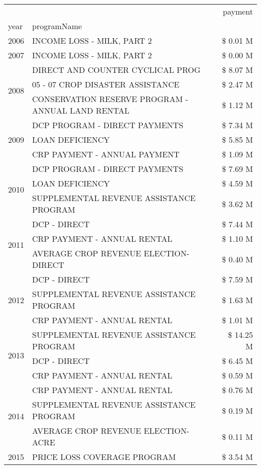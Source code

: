 \begin{tabular}{llr}
\toprule
 &  & payment \\
year & programName &  \\
\midrule
2006 & INCOME LOSS - MILK, PART 2 & \$ 0.01 M \\
\cline{1-3}
2007 & INCOME LOSS - MILK, PART 2 & \$ 0.00 M \\
\cline{1-3}
\multirow[t]{3}{*}{2008} & DIRECT AND COUNTER CYCLICAL PROG & \$ 8.07 M \\
 & 05 - 07 CROP DISASTER ASSISTANCE & \$ 2.47 M \\
 & CONSERVATION RESERVE PROGRAM - ANNUAL LAND RENTAL & \$ 1.12 M \\
\cline{1-3}
\multirow[t]{3}{*}{2009} & DCP PROGRAM - DIRECT PAYMENTS & \$ 7.34 M \\
 & LOAN DEFICIENCY & \$ 5.85 M \\
 & CRP PAYMENT - ANNUAL PAYMENT & \$ 1.09 M \\
\cline{1-3}
\multirow[t]{3}{*}{2010} & DCP PROGRAM - DIRECT PAYMENTS & \$ 7.69 M \\
 & LOAN DEFICIENCY & \$ 4.59 M \\
 & SUPPLEMENTAL REVENUE ASSISTANCE PROGRAM & \$ 3.62 M \\
\cline{1-3}
\multirow[t]{3}{*}{2011} & DCP - DIRECT & \$ 7.44 M \\
 & CRP PAYMENT - ANNUAL RENTAL & \$ 1.10 M \\
 & AVERAGE CROP REVENUE ELECTION-DIRECT & \$ 0.40 M \\
\cline{1-3}
\multirow[t]{3}{*}{2012} & DCP - DIRECT & \$ 7.59 M \\
 & SUPPLEMENTAL REVENUE ASSISTANCE PROGRAM & \$ 1.63 M \\
 & CRP PAYMENT - ANNUAL RENTAL & \$ 1.01 M \\
\cline{1-3}
\multirow[t]{3}{*}{2013} & SUPPLEMENTAL REVENUE ASSISTANCE PROGRAM & \$ 14.25 M \\
 & DCP - DIRECT & \$ 6.45 M \\
 & CRP PAYMENT - ANNUAL RENTAL & \$ 0.59 M \\
\cline{1-3}
\multirow[t]{3}{*}{2014} & CRP PAYMENT - ANNUAL RENTAL & \$ 0.76 M \\
 & SUPPLEMENTAL REVENUE ASSISTANCE PROGRAM & \$ 0.19 M \\
 & AVERAGE CROP REVENUE ELECTION-ACRE & \$ 0.11 M \\
\cline{1-3}
\multirow[t]{3}{*}{2015} & PRICE LOSS COVERAGE PROGRAM & \$ 3.54 M \\

\end{tabular}
